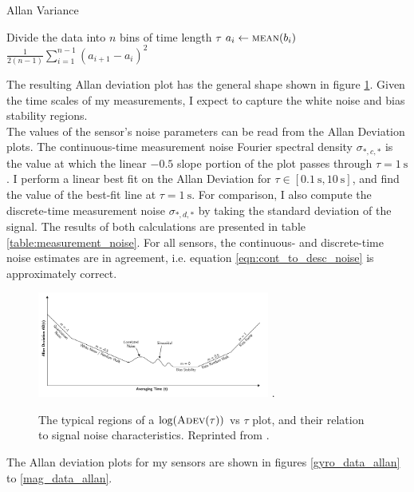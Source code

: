 \documentclass[conference]{IEEEtran}
\begin{document}
\begin{algorithm}
  \caption{Allan Variance}
  \label{avar}
  \begin{algorithmic}
      \State Divide the data into $n$ bins of time length $\tau$
        \State $a_i \gets \Call{mean}{b_i}$
      \EndFor
      \State \Return $\frac{1}{2 (n-1)} \sum_{i=1}^{n-1} (a_{i+1} - a_{i})^2$
      \EndFunction
  \end{algorithmic}
\end{algorithm}

The resulting Allan deviation plot has the general shape shown in figure \ref{allan_regions}. Given the time scales of my measurements, I expect to capture the white noise and bias stability regions. \\
The values of the sensor's noise parameters can be read from the Allan Deviation plots. The continuous-time measurement noise Fourier spectral density $\sigma_{*,c,*}$ is the value at which the linear $-0.5$ slope portion of the plot passes through $\tau = \SI{1}{\second}$ \cite{UCAM-CL-TR-696}. I perform a linear best fit on the Allan Deviation for $\tau \in [\SI{0.1}{\second}, \SI{10}{\second}]$, and find the value of the best-fit line at $\tau = \SI{1}{\second}$. For comparison, I also compute the discrete-time measurement noise $\sigma_{*,d,*}$ by taking the standard deviation of the signal. The results of both calculations are presented in table \ref{table:measurement_noise}. For all sensors, the continuous- and discrete-time noise estimates are in agreement, i.e. equation \ref{eqn:cont_to_desc_noise} is approximately correct.\\

\begin{figure}[!t]
  \centering
  \includegraphics[width=3in]{figures/allan_regions.png}
  \DeclareGraphicsExtensions.
  \caption{The typical regions of a $\log(\textproc{Adev}(\tau))$ vs $\tau$ plot, and their relation to signal noise characteristics. Reprinted from \cite{UCAM-CL-TR-696}.}
  \label{allan_regions}
\end{figure}

The Allan deviation plots for my sensors are shown in figures \ref{gyro_data_allan} to \ref{mag_data_allan}. 
\end{document}
